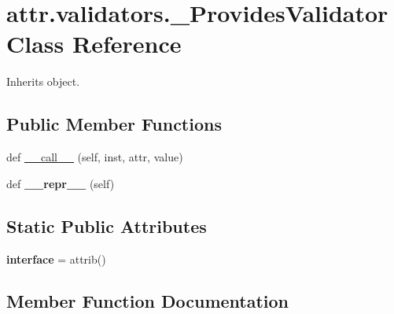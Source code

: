 \hypertarget{classattr_1_1validators_1_1___provides_validator}{}\section{attr.\+validators.\+\_\+\+Provides\+Validator Class Reference}
\label{classattr_1_1validators_1_1___provides_validator}


Inherits object.

\subsection*{Public Member Functions}
\begin{DoxyCompactItemize}
\item 
def \hyperlink{classattr_1_1validators_1_1___provides_validator_ad918cca6333a891d0ab96ec214525541}{\+\_\+\+\_\+call\+\_\+\+\_\+} (self, inst, attr, value)
\item 
\mbox{\label{classattr_1_1validators_1_1___provides_validator_a0e0c1d75406bd7f886d282f68a1b14ca}} 
def {\bfseries \+\_\+\+\_\+repr\+\_\+\+\_\+} (self)
\end{DoxyCompactItemize}
\subsection*{Static Public Attributes}
\begin{DoxyCompactItemize}
\item 
\mbox{\label{classattr_1_1validators_1_1___provides_validator_af128d12b7d1facd6c2770e9fd00aa5d2}} 
{\bfseries interface} = attrib()
\end{DoxyCompactItemize}


\subsection{Member Function Documentation}
\mbox{\label{classattr_1_1validators_1_1___provides_validator_ad918cca6333a891d0ab96ec214525541}} 
